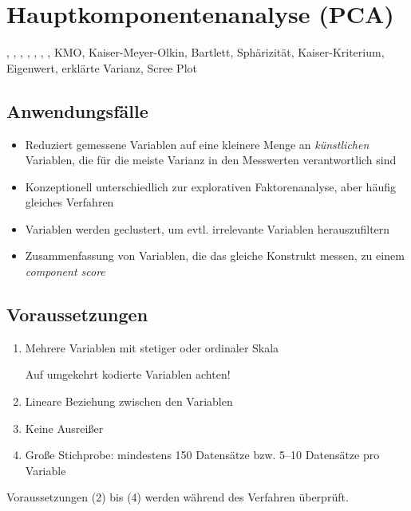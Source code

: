 \section{Hauptkomponentenanalyse (PCA)}
\label{sec:pca}
\begin{keywordbox}
	, , , , , , , KMO, Kaiser-Meyer-Olkin, Bartlett, Sphärizität, Kaiser-Kriterium, Eigenwert, erklärte Varianz, Scree Plot
\end{keywordbox}

\subsection{Anwendungsfälle}
\begin{itemize}
	\item Reduziert gemessene Variablen auf eine kleinere Menge an \textit{künstlichen} Variablen, die für die meiste Varianz in den Messwerten verantwortlich sind
	\item Konzeptionell unterschiedlich zur explorativen Faktorenanalyse, aber häufig gleiches Verfahren
	\item Variablen werden geclustert, um evtl. irrelevante Variablen herauszufiltern
	\item Zusammenfassung von Variablen, die das gleiche Konstrukt messen, zu einem \textit{component score}
\end{itemize}

\subsection{Voraussetzungen}
\begin{enumerate}[(1)]
	\item Mehrere Variablen mit stetiger oder ordinaler Skala
	\begin{alertbox}
		Auf umgekehrt kodierte Variablen achten!
	\end{alertbox}
	\item Lineare Beziehung zwischen den Variablen
	\item Keine Ausreißer
	\item Große Stichprobe: mindestens 150 Datensätze bzw. 5--10 Datensätze pro Variable
\end{enumerate}
Voraussetzungen (2) bis (4) werden während des Verfahren überprüft.

